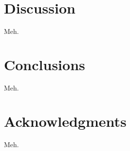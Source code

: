 \documentclass[extra,mreferee]{gji}
\begin{document}
\section{Discussion}

Meh.

\section{Conclusions}

Meh.

\section{Acknowledgments}

Meh.



\end{document}
